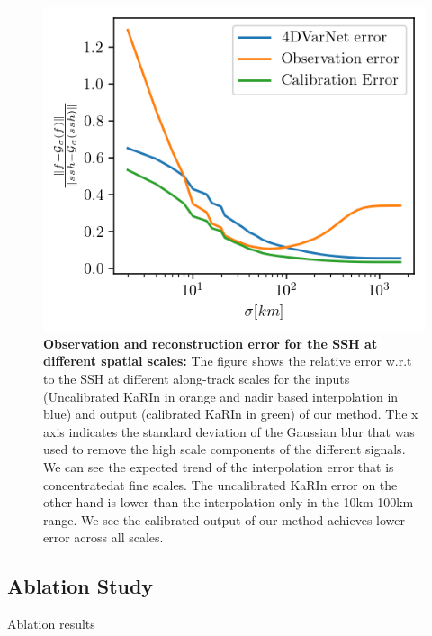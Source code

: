\begin{bibunit}
\begin{figure}[!t]
    \centering
    \includegraphics[width=\linewidth]
    {00_Calib/norm_cumsum_highpass_errors_1.png}%
    \caption{{\bf Observation and reconstruction error for the SSH at different spatial scales:}  The figure shows the relative error w.r.t to the SSH at different along-track scales for the inputs (Uncalibrated KaRIn in orange and nadir based interpolation in blue) and output (calibrated KaRIn in green) of our method. The x axis indicates the standard deviation of the Gaussian blur that was used to remove the high scale components of the different signals. We can see the expected trend of the interpolation error that is concentratedat fine scales. The uncalibrated KaRIn  error on the other hand is lower than the interpolation only in the 10km-100km range. We see the calibrated output of our method achieves lower error across all scales.}
    \label{fig:err_scales}%
\end{figure}


\subsection{Ablation Study}
\label{subsec:ablation}
\noindent

\begin{table}[t]
\begin{center}

\end{center}
\label{table:ablation}
\caption{Ablation results}
\end{table}



\end{bibunit}
